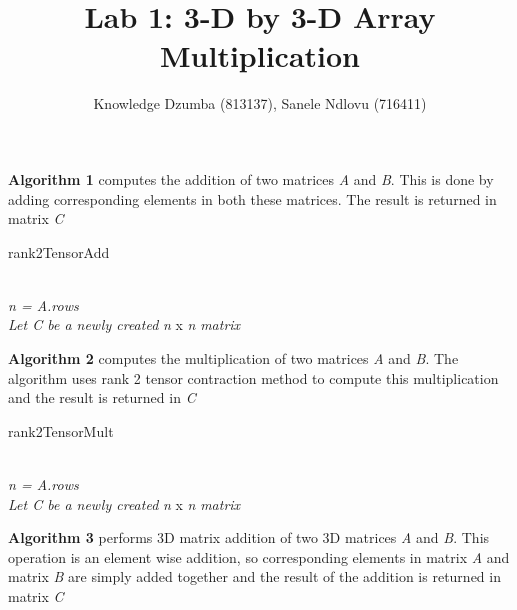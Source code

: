 \documentclass[12pt]{article}
\title{Lab 1: 3-D by 3-D Array Multiplication}
\author{Knowledge Dzumba (813137), Sanele Ndlovu (716411)}
\begin{document}
\maketitle

\pagebreak

\noindent
\textbf{Algorithm 1} computes the addition of two matrices \emph{A} and \emph{B}. This is done by adding corresponding elements in both these matrices. The result is returned in matrix \emph{C}

\begin{algorithm}
\caption{rank2TensorAdd}
\hrulefill\\

\emph{n = A.rows} \\
\emph{Let C be a newly created} \emph{n} x \emph{n} \emph{matrix} \\

\nl {} {
	\nl {}
        }
\nl {}
\end{algorithm}

\noindent
\textbf{Algorithm 2} computes the multiplication of two matrices \emph{A} and \emph{B}. The algorithm uses rank 2 tensor contraction method to compute this multiplication and the result is returned in \emph{C}

\begin{algorithm}
\caption{rank2TensorMult}
\hrulefill\\

\emph{n = A.rows} \\
\emph{Let C be a newly created} \emph{n} x \emph{n} \emph{matrix} \\
\nl {} {
	\nl {}
    }
\nl {}
\end{algorithm}

\noindent
\textbf{Algorithm 3} performs 3D matrix addition of two 3D matrices \emph{A} and \emph{B}. This operation is an element wise addition, so corresponding elements in matrix \emph{A} and matrix \emph{B} are simply added together and the result of the addition is returned in matrix \emph{C}
\end{document}
